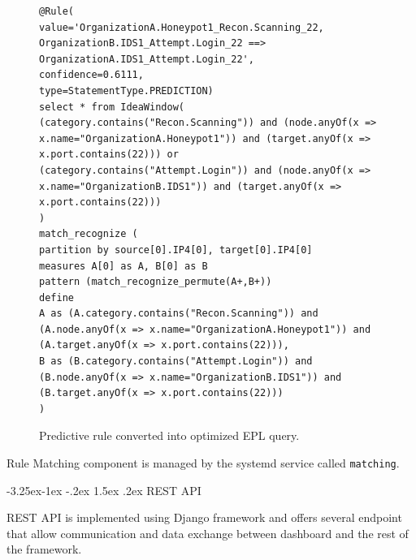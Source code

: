 \documentclass[a4paper]{article} %
\makeatletter
\renewcommand\subsection{\@startsection{subsection}{2}{\z@}%
                   {-3.25ex\@plus -1ex \@minus -.2ex}%
                   {1.5ex \@plus .2ex}%
                   {\normalfont\sffamily\large\bfseries\color{projectcolor}}}
\makeatother
\begin{document}
\begin{figure}[h!]
\begin{lstlisting}[]
@Rule(
value='OrganizationA.Honeypot1_Recon.Scanning_22, OrganizationB.IDS1_Attempt.Login_22 ==> OrganizationA.IDS1_Attempt.Login_22',
confidence=0.6111,
type=StatementType.PREDICTION)
select * from IdeaWindow(
(category.contains("Recon.Scanning")) and (node.anyOf(x => x.name="OrganizationA.Honeypot1")) and (target.anyOf(x => x.port.contains(22))) or
(category.contains("Attempt.Login")) and (node.anyOf(x => x.name="OrganizationB.IDS1")) and (target.anyOf(x => x.port.contains(22)))
)
match_recognize (
partition by source[0].IP4[0], target[0].IP4[0]
measures A[0] as A, B[0] as B
pattern (match_recognize_permute(A+,B+))
define
A as (A.category.contains("Recon.Scanning")) and (A.node.anyOf(x => x.name="OrganizationA.Honeypot1")) and (A.target.anyOf(x => x.port.contains(22))),
B as (B.category.contains("Attempt.Login")) and (B.node.anyOf(x => x.name="OrganizationB.IDS1")) and (B.target.anyOf(x => x.port.contains(22)))
)
\end{lstlisting}
\caption{Predictive rule converted into optimized EPL query.}
\label{fig:query}
\end{figure}

Rule Matching component is managed by the systemd service called \texttt{matching}.

% 

\subsection{REST API}

REST API is implemented using Django framework and offers several endpoint that allow communication and data exchange between dashboard and the rest of the framework. 
\end{document}

